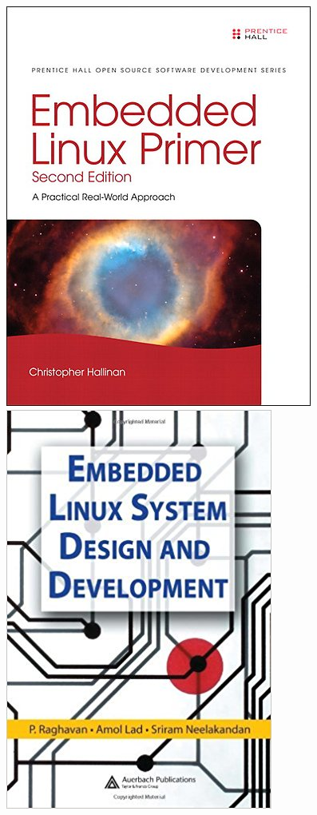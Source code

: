 \begin{frame}
\begin{columns}
    \vspace{0.5cm}
    \includegraphics[height=0.25\textheight]{slides/sysdev-references/book-embedded-linux-primer2.jpg}\\
    \vspace{0.5cm}
    \includegraphics[height=0.25\textheight]{slides/sysdev-references/book-embedded-linux-sysdev.jpg}\\
  \end{columns}
\end{frame}

